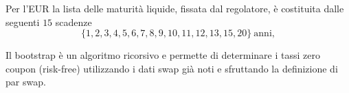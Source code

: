 \documentclass[11pt,a4paper]{article}
\theoremstyle{plain}
\theoremstyle{definition}
\theoremstyle{remark}
\newcommand{\FSP}{\mathrm{FSP}}
\newcommand{\defeq}{\coloneqq}
\begin{document}
Per l'EUR la lista delle maturit\`a liquide, fissata dal regolatore, \`e costituita dalle seguenti $15$ scadenze
\[
  \{1,2,3,4,5,6,7,8,9,10,11,12,13,15,20\}\ \text{anni},
\]


Il bootstrap è un algoritmo ricorsivo e permette di determinare i tassi zero coupon (risk-free)
utilizzando i dati swap gi\`a noti e sfruttando la definizione di par swap. %
\end{document}
